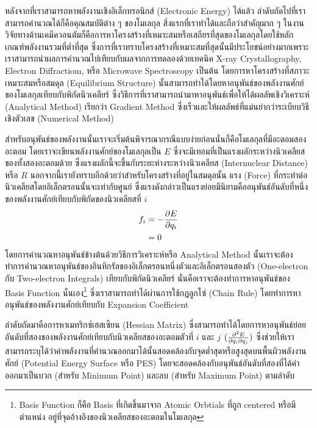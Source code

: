 หลังจากที่เราสามารถหาพลังงานเชิงอิเล็กทรอนิกส์ (Electronic Energy) ได้แล้ว ลำดับถัดไปที่เราสามารถคำนวณได้ก็คือคุณสมบัติต่าง ๆ ของโมเลกุล สิ่งแรกที่เราทำได้และถือว่าสำคัญมาก ๆ ในงานวิจัยทางด้านเคมีควอนตัมก็คือการหาโครงสร้างที่เหมาะสมหรือเสถียรที่สุดของโมเลกุลโดยใช้หลักเกณฑ์พลังงานรวมที่ต่ำที่สุด ซึ่งการที่เราทราบโครงสร้างที่เหมาะสมที่สุดนั้นมีประโยชน์อย่างมากเพราะเราสามารถนำผลการคำนวณไปเทียบกับผลจากการทดลองด้วยเทคนิค X-ray Crystallography, Electron Diffractiom, หรือ Microwave Spectroscopy เป็นต้น โดยการหาโครงสร้างที่สภาวะเหมาะสมหรือสมดุล (Equilibrium Structure) นั้นสามารถทำได้โดยหาอนุพันธ์ของพลังงานศักย์ของโมเลกุลเทียบกับพิกัดนิวเคลียร์ ซึ่งวิธีการที่เราสามารถนำมาหาอนุพันธ์เพื่อให้ได้ผลลัพเชิงวิเคราะห์ (Analytical Method) เรียกว่า Gradient Method ซึ่งเร็วและให้ผลลัพธ์ที่แม่นยำกว่าระเบียบวิธีเชิงตัวเลข (Numerical Method)

สำหรับอนุพันธ์ของพลังงานนั้นเราจะเริ่มต้นพิจารณากรณีแบบง่ายก่อนนั่นก็คือโมเลกุลที่มีอะตอมสองอะตอม โดยเราจะเขียนพลังงานศักย์ของโมเลกุลเป็น $E$ ซึ่งจะมีเทอมที่เป็นแรงผลักระหว่างนิวเคลียสของทั้งสองอะตอมด้วย ซึ่งแรงผลักนี้จะขึ้นกับระยะห่างระหว่างนิวเคลียส (Internuclear Distance) หรือ $R$ นอกจากนี้เรายังทราบอีกด้วยว่าสำหรับโครงสร้างที่อยู่ในสมดุลนั้น แรง (Force) ที่กระทำต่อนิวเคลียสโดยอิเล็กตรอนนั้นจะเท่ากับศูนย์ ซึ่งแรงดังกล่าวเป็นแรงย่อยมีนิยามคืออนุพันธ์อันดับที่หนึ่งของพลังงานศักย์เทียบกับพิกัดของนิวเคลียสที่ $i$
%
\begin{align}
    f_{i} & = - \pdv{E}{q_{i}} \\
          & = 0
\end{align}
%
โดยการคำนวณหาอนุพันธ์ข้างต้นด้วยวิธีการวิเคราะห์หรือ Analytical Method นั้นเราจะต้องทำการคำนวณหาอนุพันธ์ของอินทิกรัลของอิเล็กตรอนหนึ่งตัวและอิเล็กตรอนสองตัว (One-electron กับ Two-electron Integrals) เทียบกับพิกัดนิวเคลียร์ นั่นคือเราจะต้องทำการหาอนุพันธ์ของ Basis Function นั่นเอง\footnote{Basis Function ก็คือ Basis ที่เกิดขึ้นมาจาก Atomic Orbtials ที่ถูก centered หรือมีตำแหน่ง    อยู่ที่จุดอ้างอิงของนิวเคลียสของอะตอมในโมเลกุล} ซึ่งเราสามารถทำได้ผ่านการใช้กฎลูกโซ่ (Chain Rule) โดยทำการหาอนุพันธ์ของพลังงานศักย์เทียบกับ Expansion Coefficient

ลำดับถัดมาคือการหาเมทริกซ์เฮสเซียน (Hessian Matrix) ซึ่งสามารถทำได้โดยการหาอนุพันธ์ย่อยอันดับที่สองของพลังงานศักย์เทียบกับนิวเคลียสของอะตอมตัวที่ $i$ และ $j$ $(\pdv{E}{q_{i}}{q_{j}})$ ซึ่งช่วยให้เราสามารถระบุได้ว่าค่าพลังงานที่คำนวณออกมาได้นั้นสอดคล้องกับจุดต่ำสุดหรือสูงสุดบนพื้นผิวพลังงานศักย์ (Potential Energy Surface หรือ PES) โดยจะสอดคล้องกับอนุพันธ์อันดับที่สองที่ได้ค่าออกมาเป็นบวก (สำหรับ Minimum Point) และลบ (สำหรับ Maximum Point) ตามลำดับ

